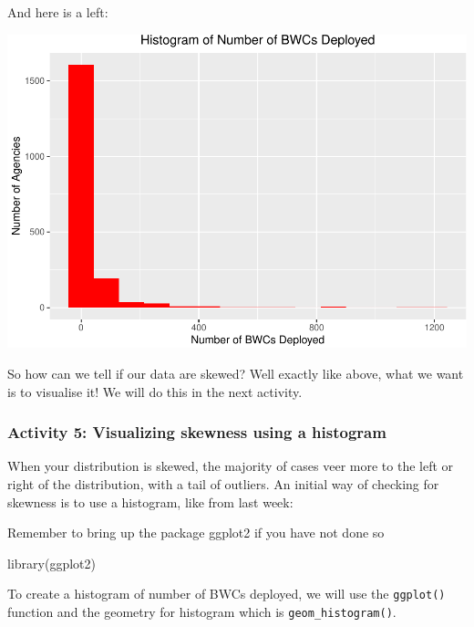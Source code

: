 \documentclass[
]{book}
\newenvironment{Shaded}{\begin{snugshade}}{\end{snugshade}}
\newcommand{\FunctionTok}[1]{\textcolor[rgb]{0.00,0.00,0.00}{#1}}
\newcommand{\NormalTok}[1]{#1}
\begin{document}
And here is a left:

\includegraphics{04-descriptive-statistics_files/figure-latex/unnamed-chunk-45-1.pdf}

So how can we tell if our data are skewed? Well exactly like above, what we want is to visualise it! We will do this in the next activity.

\hypertarget{activity-5-visualizing-skewness-using-a-histogram}{%
\subsubsection{Activity 5: Visualizing skewness using a histogram}\label{activity-5-visualizing-skewness-using-a-histogram}}

When your distribution is skewed, the majority of cases veer more to the left or right of the distribution, with a tail of outliers. An initial way of checking for skewness is to use a histogram, like from last week:

Remember to bring up the package ggplot2 if you have not done so

\begin{Shaded}
\begin{Highlighting}[]
\FunctionTok{library}\NormalTok{(ggplot2)}
\end{Highlighting}
\end{Shaded}

To create a histogram of number of BWCs deployed, we will use the \texttt{ggplot()} function and the geometry for histogram which is \texttt{geom\_histogram()}.
\end{document}
